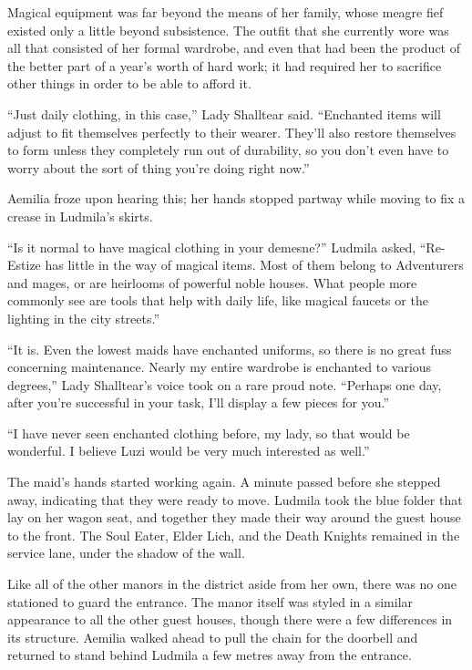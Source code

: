 Magical equipment was far beyond the means of her family, whose meagre fief existed only a little beyond subsistence. The outfit that she currently wore was all that consisted of her formal wardrobe, and even that had been the product of the better part of a year’s worth of hard work; it had required her to sacrifice other things in order to be able to afford it.

 

“Just daily clothing, in this case,” Lady Shalltear said. “Enchanted items will adjust to fit themselves perfectly to their wearer. They’ll also restore themselves to form unless they completely run out of durability, so you don’t even have to worry about the sort of thing you’re doing right now.”

 

Aemilia froze upon hearing this; her hands stopped partway while moving to fix a crease in Ludmila’s skirts.

 

“Is it normal to have magical clothing in your demesne?” Ludmila asked, “Re-Estize has little in the way of magical items. Most of them belong to Adventurers and mages, or are heirlooms of powerful noble houses. What people more commonly see are tools that help with daily life, like magical faucets or the lighting in the city streets.”

 

“It is. Even the lowest maids have enchanted uniforms, so there is no great fuss concerning maintenance. Nearly my entire wardrobe is enchanted to various degrees,” Lady Shalltear’s voice took on a rare proud note. “Perhaps one day, after you’re successful in your task, I’ll display a few pieces for you.”

 

“I have never seen enchanted clothing before, my lady, so that would be wonderful. I believe Luzi would be very much interested as well.”

 

The maid’s hands started working again. A minute passed before she stepped away, indicating that they were ready to move. Ludmila took the blue folder that lay on her wagon seat, and together they made their way around the guest house to the front. The Soul Eater, Elder Lich, and the Death Knights remained in the service lane, under the shadow of the wall.

 

Like all of the other manors in the district aside from her own, there was no one stationed to guard the entrance. The manor itself was styled in a similar appearance to all the other guest houses, though there were a few differences in its structure. Aemilia walked ahead to pull the chain for the doorbell and returned to stand behind Ludmila a few metres away from the entrance.

